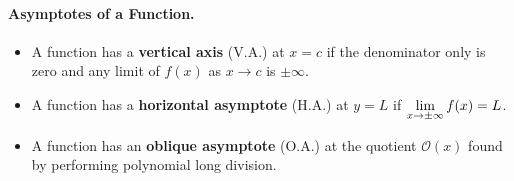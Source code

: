 \documentclass[12pt]{article}
\begin{document}
\paragraph{Asymptotes of a Function.}
\begin{itemize}
	\item A function has a \textbf{vertical axis} (V.A.) at $x=c$ if the denominator only is zero and any limit of $f(x)$ as $x\to c$ is $\pm \infty$.
	\item A function has a \textbf{horizontal asymptote} (H.A.) at $y=L$ if $\displaystyle\lim_{x\to\pm\infty}f(x)=L$.
	\item A function has an \textbf{oblique asymptote} (O.A.) at the quotient $\mathcal{O}(x)$ found by performing polynomial long division.
\end{itemize}
\end{document}
